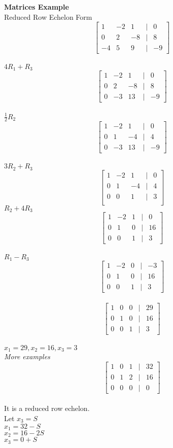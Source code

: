 \documentclass[]{article}
\begin{document}
\textbf{Matrices Example}\\
\textsf{Reduced Row Echelon Form}\\
\[
\begin{bmatrix}
	1 & -2 & 1 & | & 0 \\
	0 & 2 & -8 & | & 8 \\
	-4 & 5 & 9 & | & -9
\end{bmatrix}
\]\\
$4R_1 + R_3$\\
\[
\begin{bmatrix}
	1 & -2 & 1 & | & 0 \\
	0 & 2 & -8 & | & 8 \\
	0 & -3 & 13 & | & -9
\end{bmatrix}
\]\\
$\frac{1}{2}R_2$\\
\[
\begin{bmatrix}
	1 & -2 & 1 & | & 0 \\
	0 & 1 & -4 & | & 4 \\
	0 & -3 & 13 & | & -9
\end{bmatrix}
\]\\
$3R_2 + R_3$\\
\[
\begin{bmatrix}
	1 & -2 & 1 & | & 0 \\
	0 & 1 & -4 & | & 4 \\
	0 & 0 & 1 & | & 3 \\
\end{bmatrix}
\]
$R_2 + 4R_3$\\
\[
\begin{bmatrix}
	1 & -2 & 1 & | & 0 \\
	0 & 1 & 0 & | & 16 \\
	0 & 0 & 1 & | & 3
\end{bmatrix}
\]\\
$R_1 - R_3$\\
\[
\begin{bmatrix}
	1 & -2 & 0 & | & -3 \\
	0 & 1 & 0 & | & 16 \\
	0 & 0 & 1 & | & 3
\end{bmatrix}
\]\\
\[
\begin{bmatrix}
	1 & 0 & 0 & | & 29 \\
	0 & 1 & 0 & | & 16 \\
	0 & 0 & 1 & | & 3
\end{bmatrix}
\]\\
$x_1 = 29 , x_2 = 16 , x_3 = 3$\\
\textsl{More examples}\\
\[
\begin{bmatrix}
	1 & 0 & 1 & | & 32 \\
	0 & 1 & 2 & | & 16 \\
	0 & 0 & 0 & | & 0
\end{bmatrix}
\]\\
It is a reduced row echelon.\\
Let $x_3 = S$\\
$x_1 = 32 - S$\\
$x_2 = 16 - 2S$\\
$x_3 = 0 + S$\\
\end{document}

